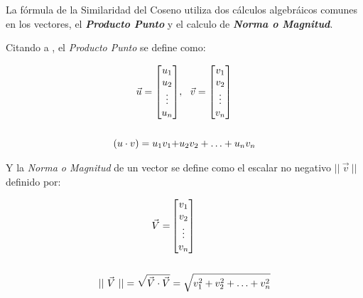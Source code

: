     La fórmula de la Similaridad del Coseno utiliza dos cálculos algebráicos comunes en los vectores, el \textbf{\textit{Producto Punto}} y el calculo de \textbf{\textit{Norma o Magnitud}}.

    Citando a \parencite{poole2007álgebra}, el \textit{Producto Punto} se define como:

    \begin{equation}
        \begin{split}
            \vec{u} = \begin{bmatrix}
                u_1
                \\
                u_2
                \\
                \vdots
                \\
                u_n
            \end{bmatrix} &,  \ \
            \vec{v} = \begin{bmatrix}
                v_1
                \\
                v_2
                \\
                \vdots
                \\
                v_n
            \end{bmatrix}
            \\
            \\
            (u \cdot v) = u_1 v_1 + &u_2 v_2 + \hdots + u_n v_n
        \end{split}
        \addequation{Definición de Producto Punto}
    \end{equation}

    Y la \textit{Norma o Magnitud} de un vector se define como el escalar no negativo $|| \ \vec{v} \ ||$ definido por: 

    \begin{equation}
        \begin{split}
            \vec{V} = &\begin{bmatrix}
                v_1
                \\
                v_2
                \\
                \vdots
                \\
                v_n
            \end{bmatrix}
            \\
            \\
            || \ \vec{V}  \ || = \sqrt{\vec{V} \cdot \vec{V}} &= \sqrt{v_1^2 + v_2^2 + \hdots + v_n^2}
        \end{split}
        \addequation{Definición de Norma o Magnitud}
    \end{equation}    

